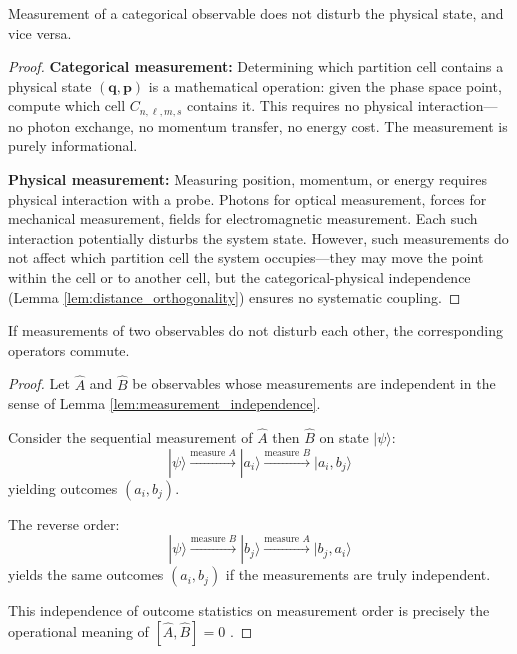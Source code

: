 \begin{lemma}
\label{lem:measurement_independence}
Measurement of a categorical observable does not disturb the physical state, and vice versa.
\end{lemma}

\begin{proof}
\textbf{Categorical measurement:} Determining which partition cell contains a physical state $(\mathbf{q}, \mathbf{p})$ is a mathematical operation: given the phase space point, compute which cell $C_{n,\ell,m,s}$ contains it. This requires no physical interaction---no photon exchange, no momentum transfer, no energy cost. The measurement is purely informational.

\textbf{Physical measurement:} Measuring position, momentum, or energy requires physical interaction with a probe. Photons for optical measurement, forces for mechanical measurement, fields for electromagnetic measurement. Each such interaction potentially disturbs the system state. However, such measurements do not affect which partition cell the system occupies---they may move the point within the cell or to another cell, but the categorical-physical independence (Lemma \ref{lem:distance_orthogonality}) ensures no systematic coupling.
\end{proof}

\begin{lemma}
\label{lem:operator_commutativity}
If measurements of two observables do not disturb each other, the corresponding operators commute.
\end{lemma}

\begin{proof}
Let $\hat{A}$ and $\hat{B}$ be observables whose measurements are independent in the sense of Lemma \ref{lem:measurement_independence}.

Consider the sequential measurement of $\hat{A}$ then $\hat{B}$ on state $|\psi\rangle$:
\begin{equation}
|\psi\rangle \xrightarrow{\text{measure } A} |a_i\rangle \xrightarrow{\text{measure } B} |a_i, b_j\rangle
\end{equation}
yielding outcomes $(a_i, b_j)$.

The reverse order:
\begin{equation}
|\psi\rangle \xrightarrow{\text{measure } B} |b_j\rangle \xrightarrow{\text{measure } A} |b_j, a_i\rangle
\end{equation}
yields the same outcomes $(a_i, b_j)$ if the measurements are truly independent.

This independence of outcome statistics on measurement order is precisely the operational meaning of $[\hat{A}, \hat{B}] = 0$ \cite{vonneumann1932}.
\end{proof}

